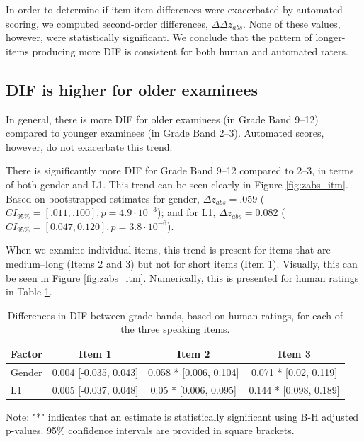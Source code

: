 \documentclass [PhD] {uclathes}
\begin{document}
In order to determine if item-item differences were exacerbated by automated scoring, we computed second-order differences, $\Delta \Delta z_{abs}$. None of these values, however, were statistically significant. We conclude that the pattern of longer-items producing more DIF is consistent for both human and automated raters. 

\subsection{DIF is higher for older examinees}

In general, there is more DIF for older examinees (in Grade Band 9–12) compared to younger examinees (in Grade Band 2–3). Automated scores, however, do not exacerbate this trend.

There is significantly more DIF for Grade Band 9–12 compared to 2–3, in terms of both gender and L1. This trend can be seen clearly in Figure \ref{fig:zabs_itm}. Based on bootstrapped estimates for gender, $\Delta z_{abs} = .059$ ($CI_{95\%} = [.011, .100], p = 4.9 \cdot 10^{-3}$); and for L1, $\Delta z_{abs} = 0.082$ ($CI_{95\%} = [0.047, 0.120], p = 3.8 \cdot 10^{-6}$). 

When we examine individual items, this trend is present for items that are medium–long (Items 2 and 3) but not for short items (Item 1). Visually, this can be seen in Figure \ref{fig:zabs_itm}. Numerically, this is presented for human ratings in Table \ref{gr_diff}. 


\begin{table}[htbp]
\centering
\caption{\label{gr_diff}
Differences in DIF between grade-bands, based on human ratings, for each of the three speaking items. }
\small  %
\begin{tabular}{lccc}
\toprule
\textbf{Factor} & \textbf{Item 1} & \textbf{Item 2} & \textbf{Item 3} \\
\midrule
Gender & 0.004 [-0.035, 0.043] & 0.058 * [0.006, 0.104] & 0.071 * [0.02, 0.119] \\
L1 & 0.005 [-0.037, 0.048] & 0.05 * [0.006, 0.095] & 0.144 * [0.098, 0.189] \\
\bottomrule
\end{tabular}
{\newline \newline Note: "*" indicates that an estimate is statistically significant using B-H adjusted p-values. 95\% confidence intervals are provided in square brackets. \par}
\end{table}
\end{document}
